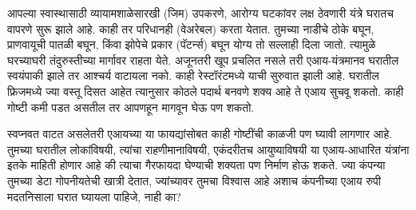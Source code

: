 आपल्या स्वास्थासाठी व्यायामशाळेसारखी (जिम) उपकरणे, आरोग्य घटकांवर लक्ष ठेवणारी यंत्रे घरातच वापरणे सुरू झाले आहे. काही तर परिधानही (वेअरेबल) करता येतात. तुमच्या नाडीचे ठोके बघून, प्राणवायूची पातळी बघून, किंवा झोपेचे प्रकार (पॅटर्न्स) बघून योग्य तो सल्लाही दिला जातो. त्यामुळे घरच्याघरी तंदुरुस्तीच्या मार्गावर राहता येते. अजूनतरी खूप प्रचलित नसले तरी एआय-यंत्रमानव घरातील स्वयंपाकी झाले तर आश्चर्य वाटायला नको. काही रेस्टॉरंटमध्ये याची सुरुवात झाली आहे. घरातील फ्रिजमध्ये ज्या वस्तू दिसत आहेत त्यानुसार कोठले पदार्थ बनवणे शक्य आहे ते एआय सुचवू शकतो. काही गोष्टी कमी पडत असतील तर आपणहून मागवून घेऊ पण शकतो.

स्वप्नवत वाटत असलेतरी एआयच्या या फायद्यांसोबत काही गोष्टींची काळजी पण घ्यावी लागणार आहे. तुमच्या घरातील लोकांविषयी, त्यांचा राहणीमानाविषयी, एकंदरीतच आयुष्याविषयी या एआय-आधारित यंत्रांना इतके माहिती होणार आहे की त्याचा गैरफायदा घेण्याची शक्यता पण निर्माण होऊ शकते. ज्या कंपन्या तुमच्या डेटा गोपनीयतेची खात्री देतात, ज्यांच्यावर तुमचा विश्वास आहे अशाच कंपनीच्या एआय रुपी मदतनिसाला घरात घ्यायला पाहिजे, नाही का?